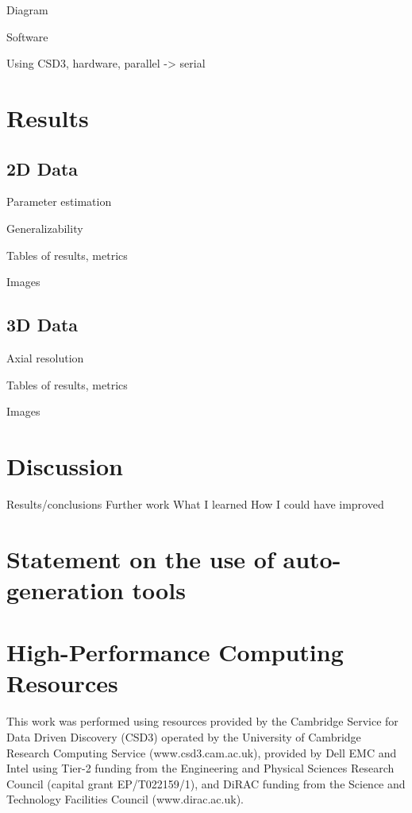 \documentclass[12pt]{article}
\begin{document}
Diagram

Software

Using CSD3, hardware, parallel -> serial

\section{Results}

\subsection{2D Data}

Parameter estimation

Generalizability

Tables of results, metrics

Images

\subsection{3D Data}

Axial resolution

Tables of results, metrics

Images

\section{Discussion}
Results/conclusions
Further work
What I learned
How I could have improved




\appendix

\section{Statement on the use of auto-generation tools}

\section {High-Performance Computing Resources}

This work was performed using resources provided by the Cambridge Service for Data Driven Discovery (CSD3) operated by the University of Cambridge Research Computing Service (www.csd3.cam.ac.uk),
provided by Dell EMC and Intel using Tier-2 funding from the Engineering and Physical Sciences Research Council (capital grant EP/T022159/1),
and DiRAC funding from the Science and Technology Facilities Council (www.dirac.ac.uk).
\end{document}
